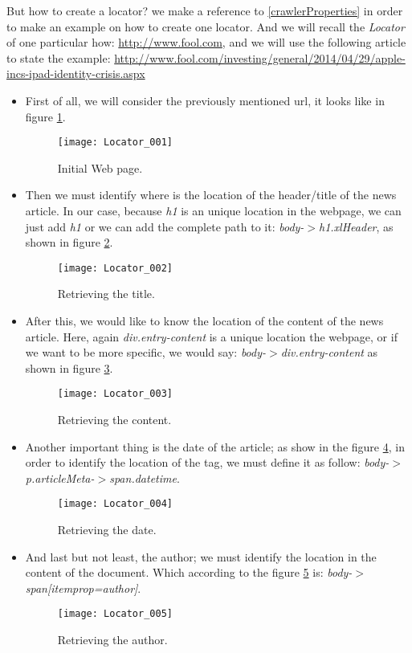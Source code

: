 But how to create a locator? we make a reference to \ref{crawlerProperties} in order to make an example on how to create one locator. And we will recall the \emph{Locator} of one particular how: \url{http://www.fool.com}, and we will use the following article to state the example: \url{http://www.fool.com/investing/general/2014/04/29/apple-incs-ipad-identity-crisis.aspx}

\begin{itemize}
	\item First of all, we will consider the previously mentioned url, it looks like in figure \ref{fig:Locator_001}.
	
\begin{figure}\centering
	\texttt{[image: Locator\_001]}
	\caption{Initial Web page.}\label{fig:Locator_001}
\end{figure}
	
	\item Then we must identify where is the location of the header/title of the news article. In our case, because \emph{h1} is an unique location in the webpage, we can just add \emph{h1} or we can add the complete path to it: \emph{body-$>$h1.xlHeader}, as shown in figure \ref{fig:Locator_002}.
	
\begin{figure}\centering
	\texttt{[image: Locator\_002]}
	\caption{Retrieving the title.}\label{fig:Locator_002}
\end{figure}
	
	\item After this, we would like to know the location of the content of the news article. Here, again \emph{div.entry-content} is a unique location the webpage, or if we want to be more specific, we would say: \emph{body-$>$div.entry-content} as shown in figure \ref{fig:Locator_003}.

\begin{figure}\centering
	\texttt{[image: Locator\_003]}
	\caption{Retrieving the content.}\label{fig:Locator_003}
\end{figure}

	\item Another important thing is the date of the article; as show in the figure \ref{fig:Locator_004}, in order to identify the location of the tag, we must define it as follow: \emph{body-$>$p.articleMeta-$>$span.datetime}.
	
\begin{figure}\centering
	\texttt{[image: Locator\_004]}
	\caption{Retrieving the date.}\label{fig:Locator_004}
\end{figure}
	
	\item And last but not least, the author; we must identify the location in the content of the document. Which according to the figure \ref{fig:Locator_005} is: \emph{body-$>$span[itemprop=author]}.
	
\begin{figure}\centering
	\texttt{[image: Locator\_005]}
	\caption{Retrieving the author.}\label{fig:Locator_005}
\end{figure}
	
\end{itemize}

